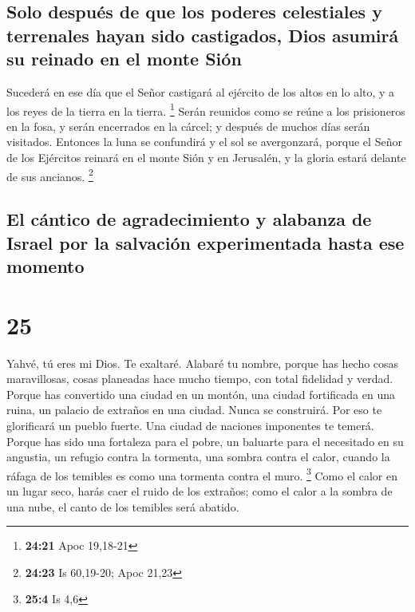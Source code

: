\hypertarget{solo-despuuxe9s-de-que-los-poderes-celestiales-y-terrenales-hayan-sido-castigados-dios-asumiruxe1-su-reinado-en-el-monte-siuxf3n}{%
\subsection{Solo después de que los poderes celestiales y terrenales
hayan sido castigados, Dios asumirá su reinado en el monte
Sión}\label{solo-despuuxe9s-de-que-los-poderes-celestiales-y-terrenales-hayan-sido-castigados-dios-asumiruxe1-su-reinado-en-el-monte-siuxf3n}}

 Sucederá en ese día que el Señor castigará al ejército
de los altos en lo alto, y a los reyes de la tierra en la tierra.
\footnote{\textbf{24:21} Apoc 19,18-21}  Serán reunidos
como se reúne a los prisioneros en la fosa, y serán encerrados en la
cárcel; y después de muchos días serán visitados. 
Entonces la luna se confundirá y el sol se avergonzará, porque el Señor
de los Ejércitos reinará en el monte Sión y en Jerusalén, y la gloria
estará delante de sus ancianos. \footnote{\textbf{24:23} Is 60,19-20;
  Apoc 21,23}

\hypertarget{el-cuxe1ntico-de-agradecimiento-y-alabanza-de-israel-por-la-salvaciuxf3n-experimentada-hasta-ese-momento}{%
\subsection{El cántico de agradecimiento y alabanza de Israel por la
salvación experimentada hasta ese
momento}\label{el-cuxe1ntico-de-agradecimiento-y-alabanza-de-israel-por-la-salvaciuxf3n-experimentada-hasta-ese-momento}}

\hypertarget{section-24}{%
\section{25}\label{section-24}}

 Yahvé, tú eres mi Dios. Te exaltaré. Alabaré tu nombre,
porque has hecho cosas maravillosas, cosas planeadas hace mucho tiempo,
con total fidelidad y verdad.  Porque has convertido una
ciudad en un montón, una ciudad fortificada en una ruina, un palacio de
extraños en una ciudad. Nunca se construirá.  Por eso te
glorificará un pueblo fuerte. Una ciudad de naciones imponentes te
temerá.  Porque has sido una fortaleza para el pobre, un
baluarte para el necesitado en su angustia, un refugio contra la
tormenta, una sombra contra el calor, cuando la ráfaga de los temibles
es como una tormenta contra el muro. \footnote{\textbf{25:4} Is 4,6}
 Como el calor en un lugar seco, harás caer el ruido de
los extraños; como el calor a la sombra de una nube, el canto de los
temibles será abatido.

